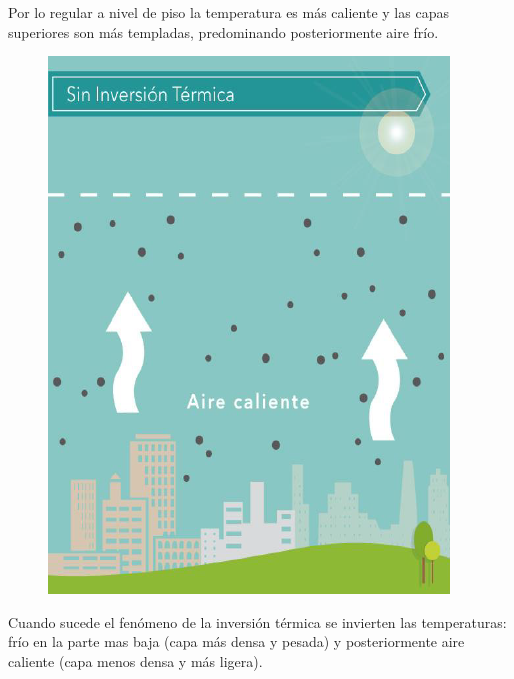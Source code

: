 \documentclass[12pt]{article}
\begin{document}
Por lo regular a nivel de piso la temperatura es más caliente y las capas superiores son más templadas, predominando posteriormente aire frío.
\begin{figure}[H]
    \centering
    \includegraphics[scale=0.5]{Imagenes/Inversion_Termica_01.png}
\end{figure}
Cuando sucede el fenómeno de la inversión térmica se invierten las temperaturas: frío en la parte mas baja (capa más densa y pesada) y posteriormente aire caliente (capa menos densa y más ligera).
\end{document}
